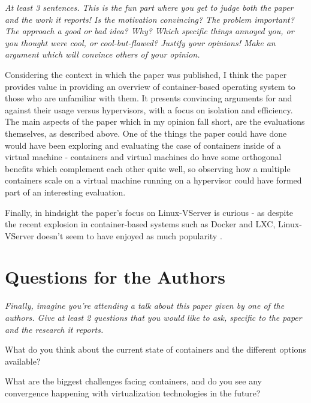 \documentclass[11pt]{article}
\begin{document}
\textsl{At least 3 sentences. This is the fun part where you get to judge both
the paper and the work it reports! Is the motivation convincing? The problem
important? The approach a good or bad idea? Why? Which specific things annoyed
you, or you thought were cool, or cool-but-flawed? Justify your opinions! Make
an argument which will convince others of your opinion.}

Considering the context in which the paper was published, I think the paper
provides value in providing an overview of container-based operating system to
those who are unfamiliar with them. It presents convincing arguments for and
against their usage versus hypervisors, with a focus on isolation and
efficiency. The main aspects of the paper which in my opinion fall short, are
the evaluations themselves, as described above. One of the things the paper
could have done would have been exploring and evaluating the case of containers
inside of a virtual machine - containers and virtual machines do have some
orthogonal benefits which complement each other quite well, so observing how a
multiple containers scale on a virtual machine running on a hypervisor could
have formed part of an interesting evaluation.

Finally, in hindsight the paper's focus on Linux-VServer is curious - as
despite the recent explosion in container-based systems such as Docker and LXC,
Linux-VServer doesn't seem to have enjoyed as much popularity
\cite{ContainerGrowth}.

\section*{Questions for the Authors}

\textsl{Finally, imagine you're attending a talk about this paper given by one
of the authors. Give at least 2 questions that you would like to ask, specific
to the paper and the research it reports.}

What do you think about the current state of containers and the different
options available?

What are the biggest challenges facing containers, and do you see any
convergence happening with virtualization technologies in the future?




\end{document}
